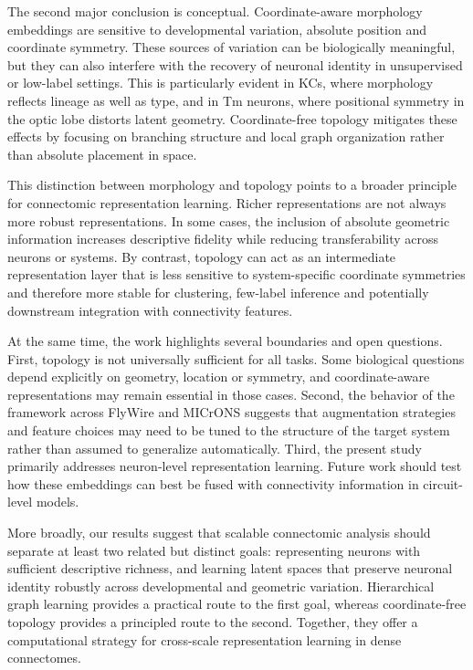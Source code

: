 \documentclass{article}
\begin{document}
The second major conclusion is conceptual. Coordinate-aware morphology embeddings are sensitive to developmental variation, absolute position and coordinate symmetry. These sources of variation can be biologically meaningful, but they can also interfere with the recovery of neuronal identity in unsupervised or low-label settings. This is particularly evident in KCs, where morphology reflects lineage as well as type, and in Tm neurons, where positional symmetry in the optic lobe distorts latent geometry. Coordinate-free topology mitigates these effects by focusing on branching structure and local graph organization rather than absolute placement in space.

This distinction between morphology and topology points to a broader principle for connectomic representation learning. Richer representations are not always more robust representations. In some cases, the inclusion of absolute geometric information increases descriptive fidelity while reducing transferability across neurons or systems. By contrast, topology can act as an intermediate representation layer that is less sensitive to system-specific coordinate symmetries and therefore more stable for clustering, few-label inference and potentially downstream integration with connectivity features.

At the same time, the work highlights several boundaries and open questions. First, topology is not universally sufficient for all tasks. Some biological questions depend explicitly on geometry, location or symmetry, and coordinate-aware representations may remain essential in those cases. Second, the behavior of the framework across FlyWire and MICrONS suggests that augmentation strategies and feature choices may need to be tuned to the structure of the target system rather than assumed to generalize automatically. Third, the present study primarily addresses neuron-level representation learning. Future work should test how these embeddings can best be fused with connectivity information in circuit-level models.

More broadly, our results suggest that scalable connectomic analysis should separate at least two related but distinct goals: representing neurons with sufficient descriptive richness, and learning latent spaces that preserve neuronal identity robustly across developmental and geometric variation. Hierarchical graph learning provides a practical route to the first goal, whereas coordinate-free topology provides a principled route to the second. Together, they offer a computational strategy for cross-scale representation learning in dense connectomes.
\end{document}
